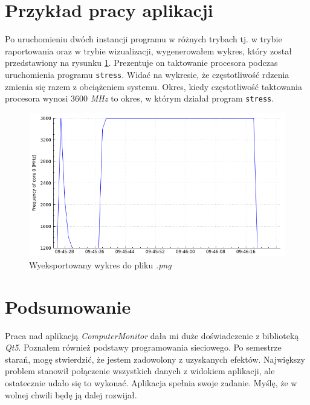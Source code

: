 \documentclass[a4paper]{article}
\begin{document}
\section{Przykład pracy aplikacji}

Po uruchomieniu dwóch instancji programu w różnych trybach tj. w trybie raportowania oraz w trybie wizualizacji, wygenerowałem wykres, który został przedstawiony na rysunku \ref{wykres_aplikacja}. Prezentuje on taktowanie procesora podczas uruchomienia programu \texttt{stress}. Widać na wykresie, że częstotliwość rdzenia zmienia się razem z obciążeniem systemu. Okres, kiedy częstotliwość taktowania procesora wynosi 3600 \textit{MHz} to okres, w którym działał program \texttt{stress}.

\begin{figure}[H]
	\centering
	\includegraphics[height=0.25\paperheight]{img/wykres.png}
	\caption{Wyeksportowany wykres do pliku \textit{.png}}
	\label{wykres_aplikacja}
\end{figure}

\section{Podsumowanie}

Praca nad aplikacją \textit{ComputerMonitor} dała mi duże doświadczenie z biblioteką \textit{Qt5}. Poznałem również podstawy programowania sieciowego. Po semestrze starań, mogę stwierdzić, że jestem zadowolony z uzyskanych efektów. Największy problem stanowił połączenie wszystkich danych z widokiem aplikacji, ale ostatecznie udało się to wykonać. Aplikacja spełnia swoje zadanie. Myślę, że w wolnej chwili będę ją dalej rozwijał.
\end{document}
